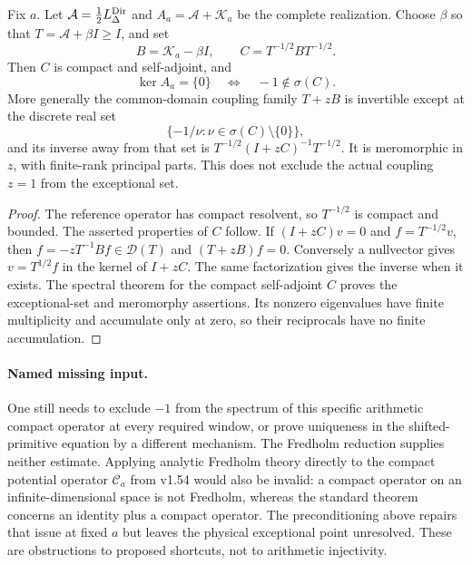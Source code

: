 \begin{proposition}
\label{prop:ns55-coupling-fredholm}
Fix $a$. Let $\mathcal A=\tfrac12L_\Delta^{\rm Dir}$ and
$A_a=\mathcal A+\mathcal K_a$ be the complete realization.
Choose $\beta$ so that $T=\mathcal A+\beta I\ge I$, and set
\[
 B=\mathcal K_a-\beta I,\qquad
 C=T^{-1/2}BT^{-1/2}.
\]
Then $C$ is compact and self-adjoint, and
\begin{equation}\label{eq:ns55-fredholm-equivalence}
 \ker A_a=\{0\}\quad\Longleftrightarrow\quad
 -1\notin\sigma(C).
\end{equation}
More generally the common-domain coupling family $T+zB$ is
invertible except at the discrete real set
\[
 \{-1/\nu:\nu\in\sigma(C)\setminus\{0\}\},
\]
and its inverse away from that set is
$T^{-1/2}(I+zC)^{-1}T^{-1/2}$. It is meromorphic in $z$,
with finite-rank principal parts. This does not exclude the actual
coupling $z=1$ from the exceptional set.
\end{proposition}
\begin{proof}
The reference operator has compact resolvent, so $T^{-1/2}$ is
compact and bounded. The asserted properties of $C$ follow.
If $(I+zC)v=0$ and $f=T^{-1/2}v$, then
$f=-zT^{-1}Bf\in\mathcal D(T)$ and $(T+zB)f=0$.
Conversely a nullvector gives $v=T^{1/2}f$ in the kernel of
$I+zC$. The same factorization gives the inverse when it exists.
The spectral theorem for the compact self-adjoint $C$ proves the
exceptional-set and meromorphy assertions. Its nonzero eigenvalues
have finite multiplicity and accumulate only at zero, so their
reciprocals have no finite accumulation.
\end{proof}

\paragraph{Named missing input.}
One still needs to exclude $-1$ from the spectrum of this specific
arithmetic compact operator at every required window, or prove
uniqueness in the shifted-primitive equation by a different mechanism.
The Fredholm reduction supplies neither estimate. Applying analytic
Fredholm theory directly to the compact potential operator
$\mathcal C_a$ from v1.54 would also be invalid: a compact operator
on an infinite-dimensional space is not Fredholm, whereas the
standard theorem concerns an identity plus a compact operator.
The preconditioning above repairs that issue at fixed $a$ but
leaves the physical exceptional point unresolved. These are
obstructions to proposed shortcuts, not to arithmetic injectivity.
